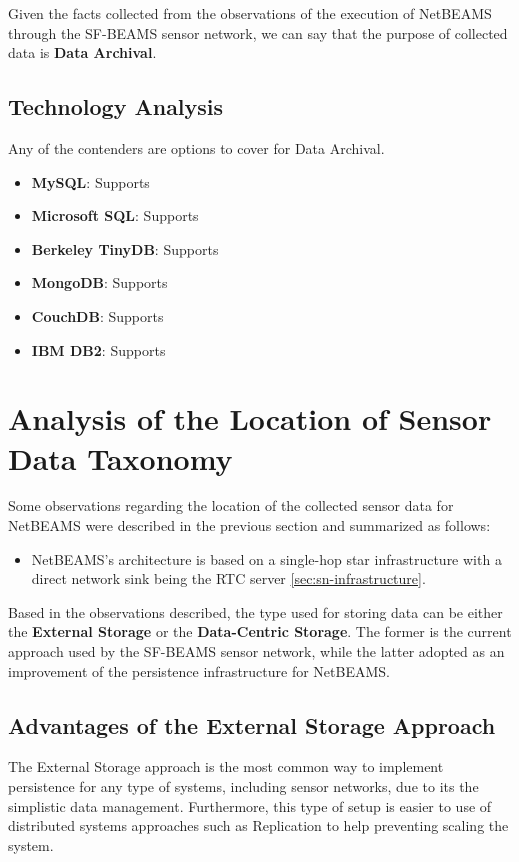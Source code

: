 Given the facts collected from the observations of the execution of NetBEAMS
through the SF-BEAMS sensor network, we can say that the purpose of collected
data is \textbf{Data Archival}.

\subsection{Technology Analysis}

Any of the contenders are options to cover for Data Archival.

\begin{itemize}
  \item \textbf{MySQL}: Supports
  \item \textbf{Microsoft SQL}: Supports
  \item \textbf{Berkeley TinyDB}: Supports
  \item \textbf{MongoDB}: Supports
  \item \textbf{CouchDB}: Supports
  \item \textbf{IBM DB2}: Supports
\end{itemize}

\section{Analysis of the Location of Sensor Data Taxonomy}

Some observations regarding the location of the collected sensor data for
NetBEAMS were described in the previous section and summarized as follows:

\begin{itemize}
  \item NetBEAMS's architecture is based on a single-hop star infrastructure 
   with a direct network sink being the RTC server \ref{sec:sn-infrastructure}.
\end{itemize}

Based in the observations described, the type used for storing
data can be either the \textbf{External Storage} or the
\textbf{Data-Centric Storage}. The former is the current approach used by the
SF-BEAMS sensor network, while the latter adopted as an improvement of the
persistence infrastructure for NetBEAMS.

\subsection{Advantages of the External Storage Approach}

The External Storage approach is the most common way to implement persistence
for any type of systems, including sensor networks, due to its the simplistic
data management. Furthermore, this type of setup is easier to use of
distributed systems approaches such as Replication to help preventing scaling
the system.

